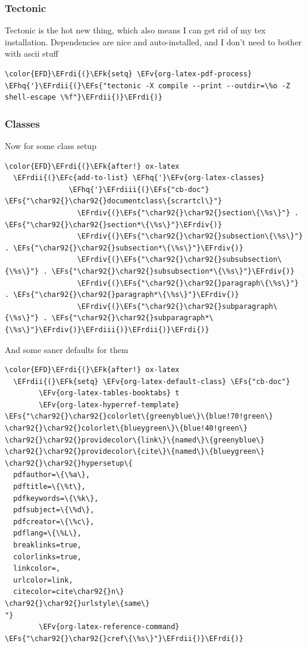 \documentclass{scrartcl}
\newcommand{\EFk}[1]{\textcolor{EFk}{#1}} %
\newcommand{\EFs}[1]{\textcolor{EFs}{#1}} %
\newcommand{\EFc}[1]{\textcolor{EFc}{#1}} %
\newcommand{\EFv}[1]{\textcolor{EFv}{#1}} %
\newcommand{\EFhq}[1]{\textcolor{EFhq}{#1}} %
\newcommand{\EFrdi}[1]{\textcolor{EFrdi}{#1}} %
\newcommand{\EFrdii}[1]{\textcolor{EFrdii}{#1}} %
\newcommand{\EFrdiii}[1]{\textcolor{EFrdiii}{#1}} %
\newcommand{\EFrdiv}[1]{\textcolor{EFrdiv}{#1}} %
\begin{document}
\subsubsection{Tectonic}
\label{sec:org0643033}
Tectonic is the hot new thing, which also means I can get rid of my tex
installation. Dependencies are nice and auto-installed, and I don't need to
bother with ascii stuff
\begin{Code}
\begin{Verbatim}[]
\color{EFD}\EFrdi{(}\EFk{setq} \EFv{org-latex-pdf-process} \EFhq{'}\EFrdii{(}\EFs{"tectonic -X compile --print --outdir=\%o -Z shell-escape \%f"}\EFrdii{)}\EFrdi{)}
\end{Verbatim}
\end{Code}

\subsubsection{Classes}
\label{sec:org7a89a1e}
Now for some class setup

\begin{Code}
\begin{Verbatim}[]
\color{EFD}\EFrdi{(}\EFk{after!} ox-latex
  \EFrdii{(}\EFc{add-to-list} \EFhq{'}\EFv{org-latex-classes}
               \EFhq{'}\EFrdiii{(}\EFs{"cb-doc"} \EFs{"\char92{}\char92{}documentclass\{scrartcl\}"}
                 \EFrdiv{(}\EFs{"\char92{}\char92{}section\{\%s\}"} . \EFs{"\char92{}\char92{}section*\{\%s\}"}\EFrdiv{)}
                 \EFrdiv{(}\EFs{"\char92{}\char92{}subsection\{\%s\}"} . \EFs{"\char92{}\char92{}subsection*\{\%s\}"}\EFrdiv{)}
                 \EFrdiv{(}\EFs{"\char92{}\char92{}subsubsection\{\%s\}"} . \EFs{"\char92{}\char92{}subsubsection*\{\%s\}"}\EFrdiv{)}
                 \EFrdiv{(}\EFs{"\char92{}\char92{}paragraph\{\%s\}"} . \EFs{"\char92{}\char92{}paragraph*\{\%s\}"}\EFrdiv{)}
                 \EFrdiv{(}\EFs{"\char92{}\char92{}subparagraph\{\%s\}"} . \EFs{"\char92{}\char92{}subparagraph*\{\%s\}"}\EFrdiv{)}\EFrdiii{)}\EFrdii{)}\EFrdi{)}
\end{Verbatim}
\end{Code}

And some saner defaults for them

\begin{Code}
\begin{Verbatim}[]
\color{EFD}\EFrdi{(}\EFk{after!} ox-latex
  \EFrdii{(}\EFk{setq} \EFv{org-latex-default-class} \EFs{"cb-doc"}
        \EFv{org-latex-tables-booktabs} t
        \EFv{org-latex-hyperref-template} \EFs{"\char92{}\char92{}colorlet\{greenyblue\}\{blue!70!green\}
\char92{}\char92{}colorlet\{blueygreen\}\{blue!40!green\}
\char92{}\char92{}providecolor\{link\}\{named\}\{greenyblue\}
\char92{}\char92{}providecolor\{cite\}\{named\}\{blueygreen\}
\char92{}\char92{}hypersetup\{
  pdfauthor=\{\%a\},
  pdftitle=\{\%t\},
  pdfkeywords=\{\%k\},
  pdfsubject=\{\%d\},
  pdfcreator=\{\%c\},
  pdflang=\{\%L\},
  breaklinks=true,
  colorlinks=true,
  linkcolor=,
  urlcolor=link,
  citecolor=cite\char92{}n\}
\char92{}\char92{}urlstyle\{same\}
"}
        \EFv{org-latex-reference-command} \EFs{"\char92{}\char92{}cref\{\%s\}"}\EFrdii{)}\EFrdi{)}
\end{Verbatim}
\end{Code}
\end{document}

